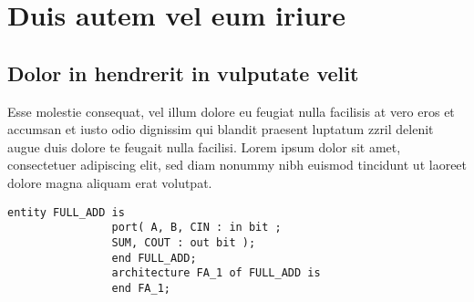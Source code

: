 \documentclass[
    a4paper,             %
    12pt,                %
    headheight=34pt,     %
    parskip,             %
    bibliography=totoc,  %
    index=totoc,         %
    listof=totoc,        %
    ]{scrartcl}          %
\begin{document}
    \section{Duis autem vel eum iriure}
        \subsection{Dolor in hendrerit in vulputate velit }
            Esse molestie consequat, vel illum dolore eu feugiat nulla facilisis at vero eros et accumsan et iusto odio dignissim qui blandit praesent luptatum zzril delenit augue duis dolore te feugait nulla facilisi. Lorem ipsum dolor sit amet, consectetuer adipiscing elit, sed diam nonummy nibh euismod tincidunt ut laoreet dolore magna aliquam erat volutpat.   
            
            \begin{lstlisting}[style=vhdl]
                entity FULL_ADD is
                port( A, B, CIN : in bit ;
                SUM, COUT : out bit );
                end FULL_ADD;
                architecture FA_1 of FULL_ADD is
                end FA_1;
            \end{lstlisting}
        
\end{document}
